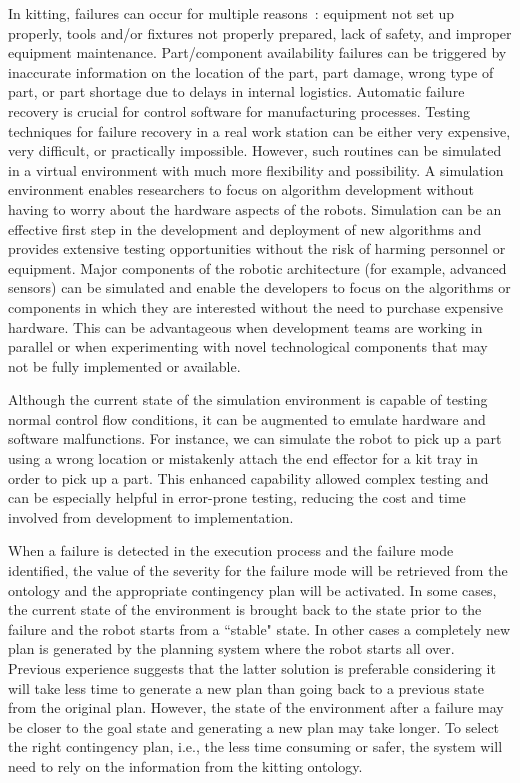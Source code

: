 \documentclass[final,3p,12pt]{elsarticle}
\begin{document}
In kitting, failures can occur for multiple reasons~\cite{Leger.1999,Kaiser.2007}: equipment not set up properly,
tools and/or fixtures not properly prepared, lack of safety, and improper equipment
maintenance. Part/component availability failures can be triggered by inaccurate information
on the location of the part, part damage, wrong type of part, or part shortage due to delays
in internal logistics.
Automatic failure recovery is crucial for control software for manufacturing processes. Testing techniques for failure recovery in a real work station can be either very expensive, very difficult, or practically impossible. However, such routines can be simulated in a virtual environment with much more flexibility and possibility. A simulation environment enables researchers to focus on algorithm development without having to worry about the hardware aspects of the robots. Simulation can be an effective first step in the development and deployment of new algorithms and provides extensive testing opportunities without the risk of harming personnel or equipment. Major components of the robotic architecture (for example, advanced sensors) can be simulated and enable the developers to focus on the algorithms or components in which they are interested without the need to purchase expensive hardware. This can be advantageous when development teams are working in parallel or when experimenting with novel technological components that may not be fully implemented or available.

Although the current state of the simulation environment is capable of testing normal control flow conditions, it can be augmented to emulate hardware and software malfunctions. For instance, we can simulate the robot to pick up a part using a wrong location or mistakenly attach the end effector for a kit tray in order to pick up a part. This enhanced capability allowed complex testing and can be especially helpful in error-prone testing, reducing the cost and time involved from development to implementation.

When a failure is detected in the execution process and the failure mode identified, the
value of the severity for the failure mode will be retrieved from the ontology and the
appropriate contingency plan will be activated. In some cases, the current state of the environment is brought back to the state prior to the failure and the robot starts from a
``stable" state. In other cases a completely new plan is generated by the planning system
where the robot starts all over. Previous experience suggests that the latter solution is
preferable considering it will take less time to generate a new plan than going back to a
previous state from the original plan. However, the state of the environment after a failure
may be closer to the goal state and generating a new plan may take longer. To
select the right contingency plan, i.e., the less time consuming or safer, the system will
need to rely on the information from the kitting ontology.
\end{document}
